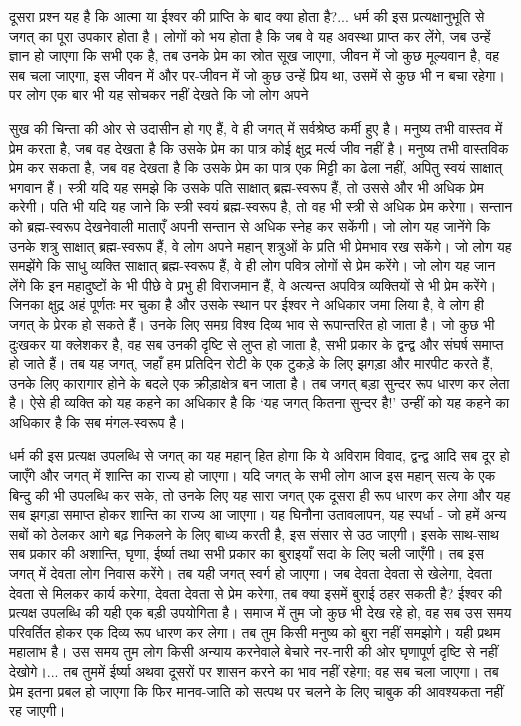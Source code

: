 {\stretchpara दूसरा प्रश्न यह है कि आत्मा या ईश्वर की प्राप्ति के बाद क्या होता है?... धर्म की इस प्रत्यक्षानुभूति से जगत् का पूरा उपकार होता है। लोगों को भय होता है कि जब वे यह अवस्था प्राप्त कर लेंगे, जब उन्हें ज्ञान हो जाएगा कि सभी एक है, तब उनके प्रेम का स्रोत सूख जाएगा, जीवन में जो कुछ मूल्यवान है, वह सब चला जाएगा, इस जीवन में और पर-जीवन में जो कुछ उन्हें प्रिय था, उसमें से कुछ भी न बचा रहेगा। पर लोग एक बार भी यह सोचकर नहीं देखते कि जो लोग अपने\par}\newpage\noindent सुख की चिन्ता की ओर से उदासीन हो गए हैं, वे ही जगत् में सर्वश्रेष्ठ कर्मी हुए है। मनुष्य तभी वास्तव में प्रेम करता है, जब वह देखता है कि उसके प्रेम का पात्र कोई क्षुद्र मर्त्य जीव नहीं है। मनुष्य तभी वास्तविक प्रेम कर सकता है, जब वह देखता है कि उसके प्रेम का पात्र एक मिट्टी का ढेला नहीं, अपितु स्वयं साक्षात् भगवान हैं। स्त्री यदि यह समझे कि उसके पति साक्षात् ब्रह्म-स्वरूप हैं, तो उससे और भी अधिक प्रेम करेगी। पति भी यदि यह जाने कि स्त्री स्वयं ब्रह्म-स्वरूप है, तो वह भी स्त्री से अधिक प्रेम करेगा। सन्तान को ब्रह्म-स्वरूप देखनेवाली माताएँ अपनी सन्तान से अधिक स्नेह कर सकेंगी। जो लोग यह जानेंगे कि उनके शत्रु साक्षात् ब्रह्म-स्वरूप हैं, वे लोग अपने महान् शत्रुओं के प्रति भी प्रेमभाव रख सकेंगे। जो लोग यह समझेंगे कि साधु व्यक्ति साक्षात् ब्रह्म-स्वरूप हैं, वे ही लोग पवित्र लोगों से प्रेम करेंगे। जो लोग यह जान लेंगे कि इन महादुष्टों के भी पीछे वे प्रभु ही विराजमान हैं, वे अत्यन्त अपवित्र व्यक्तियों से भी प्रेम करेंगे। जिनका क्षुद्र अहं पूर्णतः मर चुका है और उसके स्थान पर ईश्वर ने अधिकार जमा लिया है, वे लोग ही जगत् के प्रेरक हो सकते हैं। उनके लिए समग्र विश्व दिव्य भाव से रूपान्तरित हो जाता है। जो कुछ भी दुःखकर या क्लेशकर है, वह सब उनकी दृष्टि से लुप्त हो जाता है, सभी प्रकार के द्वन्द्व और संघर्ष समाप्त हो जाते हैं। तब यह जगत्, जहाँ हम प्रतिदिन रोटी के एक टुकड़े के लिए झगड़ा और मारपीट करते हैं, उनके लिए कारागार होने के बदले एक क्रीड़ाक्षेत्र बन जाता है। तब जगत् बड़ा सुन्दर रूप धारण कर लेता है। ऐसे ही व्यक्ति को यह कहने का अधिकार है कि ‘यह जगत् कितना सुन्दर है!’ उन्हीं को यह कहने का अधिकार है कि सब मंगल-स्वरूप है। 

धर्म की इस प्रत्यक्ष उपलब्धि से जगत् का यह महान् हित होगा कि ये अविराम विवाद, द्वन्द्व आदि सब दूर हो जाएँगे और जगत् में शान्ति का राज्य हो जाएगा। यदि जगत् के सभी लोग आज इस महान् सत्य के एक बिन्दु की भी उपलब्धि कर सके, तो उनके लिए यह सारा जगत् एक दूसरा ही रूप धारण कर लेगा और यह सब झगड़ा समाप्त होकर शान्ति का राज्य आ जाएगा। यह घिनौना उतावलापन, यह स्पर्धा - जो हमें अन्य सबों को ठेलकर आगे बढ़ निकलने के लिए बाध्य करती है, इस संसार से उठ जाएगी। इसके साथ-साथ सब प्रकार की अशान्ति, घृणा, ईर्ष्या तथा सभी प्रकार का बुराइयाँ सदा के लिए चली जाएँगी। तब इस जगत् में देवता लोग निवास करेंगे। तब यही जगत् स्वर्ग हो जाएगा। जब देवता देवता से खेलेगा, देवता देवता से मिलकर कार्य करेगा, देवता देवता से प्रेम करेगा, तब क्या इसमें बुराई ठहर सकती है? ईश्वर की प्रत्यक्ष उपलब्धि की यही एक बड़ी उपयोगिता है। समाज में तुम जो कुछ भी देख रहे हो, वह सब उस समय परिवर्तित होकर एक दिव्य रूप धारण कर लेगा। तब तुम किसी मनुष्य को बुरा नहीं समझोगे। यही प्रथम महालाभ है। उस समय तुम लोग किसी अन्याय करनेवाले बेचारे नर-नारी की ओर घृणापूर्ण दृष्टि से नहीं देखोगे।... तब तुममें ईर्ष्या अथवा दूसरों पर शासन करने का भाव नहीं रहेगा; वह सब चला जाएगा। तब प्रेम इतना प्रबल हो जाएगा कि फिर मानव-जाति को सत्पथ पर चलने के लिए चाबुक की आवश्यकता नहीं रह जाएगी। 


